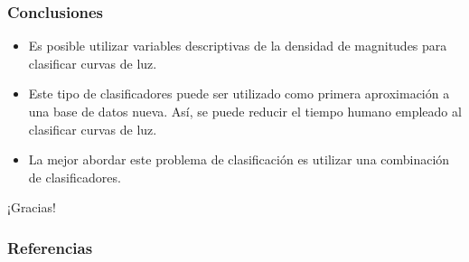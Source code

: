 \documentclass{beamer}
\begin{document}
\begin{frame}
  \frametitle{Conclusiones}
  \begin{itemize}
  \item Es posible utilizar variables descriptivas de la densidad de magnitudes para clasificar curvas de luz.
  \item Este tipo de clasificadores puede ser utilizado como primera aproximación a una base de datos nueva. Así, se puede reducir el tiempo humano empleado al clasificar curvas de luz. 
  \item La mejor abordar este problema de clasificación es utilizar una combinación de clasificadores.
  \end{itemize}
\end{frame}

\begin{frame}
  ¡Gracias!
\end{frame}


\begin{frame}[allowframebreaks]
  \frametitle{Referencias}
  
  
\end{frame}
\end{document}
